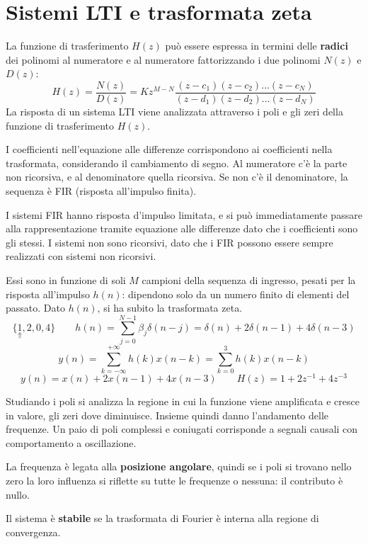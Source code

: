 \section{Sistemi LTI e trasformata zeta}
La funzione di trasferimento $H(z)$ può essere espressa in termini delle \textbf{radici} dei polinomi al numeratore e al numeratore fattorizzando i due polinomi $N(z)$ e $D(z)$:
$$H(z) = \frac{N(z)}{D(z)} = Kz^{M-N} \frac{(z-c_1)(z-c_2) \dots (z-c_N)}{(z-d_1)(z-d_2)\dots(z-d_N)}$$
La risposta di un sistema LTI viene analizzata attraverso i poli e gli zeri della funzione di trasferimento $H(z)$.

I coefficienti nell'equazione alle differenze corrispondono ai coefficienti nella trasformata, considerando il cambiamento di segno. Al numeratore c'è la parte non ricorsiva, e al denominatore quella ricorsiva. Se non c'è il denominatore, la sequenza è FIR (risposta all'impulso finita).

I sistemi FIR hanno risposta d'impulso limitata, e si può immediatamente passare alla rappresentazione tramite equazione alle differenze dato che i coefficienti sono gli stessi. I sistemi non sono ricorsivi, dato che i FIR possono essere sempre realizzati con sistemi non ricorsivi.

Essi sono in funzione di soli $M$ campioni della sequenza di ingresso, pesati per la risposta all'impulso $h(n)$: dipendono solo da un numero finito di elementi del passato. Dato $h(n)$, si ha subito la trasformata zeta.
$$\{\underset{\Uparrow}1, 2, 0, 4\} \qquad h(n) = \sum_{j=0}^{N-1}\beta_j\delta(n - j) = \delta(n) + 2\delta(n - 1) + 4\delta(n - 3)$$
$$y(n) = \sum_{k=-\infty}^{+\infty} h(k)x(n-k) = \sum_{k=0}^{3}h(k)x(n-k)$$
$$y(n) = x(n) + 2x(n-1) + 4x(n-3) \qquad H(z) = 1+2z^{-1} + 4z^{-3}$$

Studiando i poli si analizza la regione in cui la funzione viene amplificata e cresce in valore, gli zeri dove diminuisce. Insieme quindi danno l'andamento delle frequenze. Un paio di poli complessi e coniugati corrisponde a segnali causali con comportamento a oscillazione.

La frequenza è legata alla \textbf{posizione angolare}, quindi se i poli si trovano nello zero la loro influenza si riflette su tutte le frequenze o nessuna: il contributo è nullo.

Il sistema è \textbf{stabile} se la trasformata di Fourier è interna alla regione di convergenza. 

